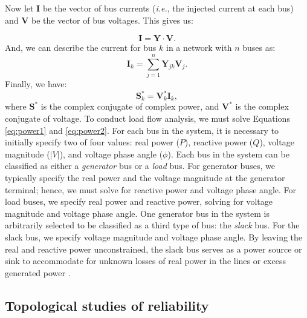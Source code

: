 Now let $\mathbf{I}$ be the vector of bus currents (\emph{i.e.}, the injected current at each bus) and $\mathbf{V}$ be the vector of bus voltages.  This gives us:

\begin{equation}
\mathbf{I} = \mathbf{Y} \cdot \mathbf{V}.
\end{equation}
%
And, we can describe the current for bus $k$ in a network with $n$ buses as:
%
\begin{equation}
\mathbf{I}_k  = \sum\limits_{j = 1}^n {\mathbf{Y}_{jk}\mathbf{V}_j}.
\label{eq:power1}
\end{equation}
%
Finally, we have:
%
\begin{equation}
\mathbf{S}^{*}_k = \mathbf{V}^{*}_k \mathbf{I}_k,
\label{eq:power2}
\end{equation}
%
where $\mathbf{S^*}$ is the complex conjugate of complex power, and $\mathbf{V^*}$ is the complex conjugate of voltage.  To conduct load flow analysis, we must solve Equations \ref{eq:power1} and \ref{eq:power2}.  For each bus in the system, it is necessary to initially specify two of four values: real power ($P$), reactive power ($Q$), voltage magnitude ($\lvert V\rvert$), and voltage phase angle ($\phi$).  Each bus in the system can be classified as either a \emph{generator} bus or a \emph{load} bus.  For generator buses, we typically specify the real power and the voltage magnitude at the generator terminal; hence, we must solve for reactive power and voltage phase angle.  For load buses, we specify real power and reactive power, solving for voltage magnitude and voltage phase angle.  One generator bus in the system is arbitrarily selected to be classified as a third type of bus: the \emph{slack} bus.  For the slack bus, we specify voltage magnitude and voltage phase angle.  By leaving the real and reactive power unconstrained, the slack bus serves as a power source or sink to accommodate for unknown losses of real power in the lines or excess generated power \cite{Powell2005}.



\subsection{Topological studies of reliability}
\label{sec:ch1:powerreliability:topology}

